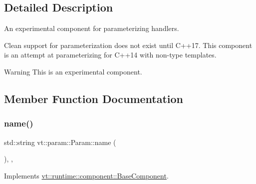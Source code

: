 \subsection{Detailed Description}
An experimental component for parameterizing handlers. 

Clean support for parameterization does not exist until C++17. This component is an attempt at parameterizing for C++14 with non-\/type templates.

\begin{DoxyWarning}{Warning}
This is an experimental component. 
\end{DoxyWarning}


\subsection{Member Function Documentation}
\mbox{\label{structvt_1_1param_1_1_param_a848380f8509c11b8bffcf0724af77127}} 
\subsubsection{\texorpdfstring{name()}{name()}}
{\footnotesize\ttfamily std\+::string vt\+::param\+::\+Param\+::name (\begin{DoxyParamCaption}{ }\end{DoxyParamCaption})\hspace{0.3cm}{\ttfamily [inline]}, {\ttfamily [override]}, {\ttfamily [virtual]}}



Implements \hyperlink{structvt_1_1runtime_1_1component_1_1_base_component_a7701485f3539f78d42e6bad47fc7eb78}{vt\+::runtime\+::component\+::\+Base\+Component}.

\mbox{\label{structvt_1_1param_1_1_param_a6b2fedacd76ee622efdb14038b0d82fe}} 
